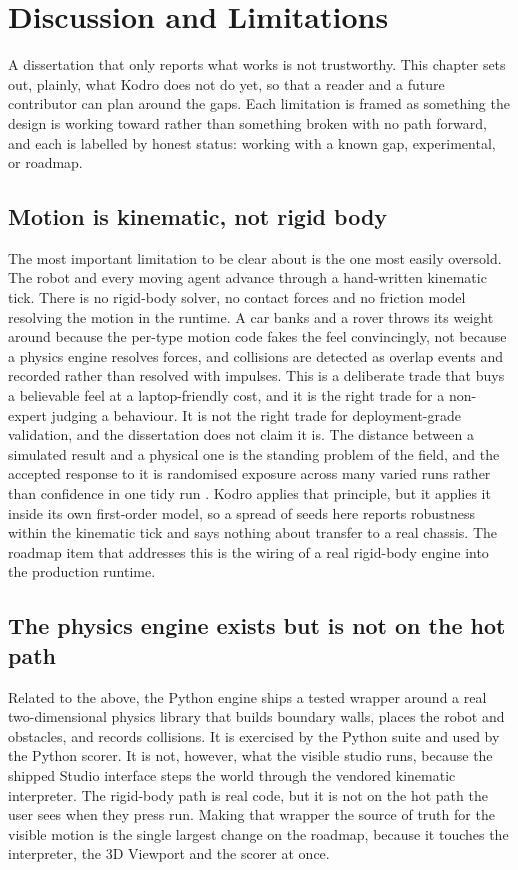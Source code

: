 \documentclass[11pt,a4paper]{report}
\begin{document}
\chapter{Discussion and Limitations}

A dissertation that only reports what works is not trustworthy. This chapter sets out, plainly, what Kodro does not do yet, so that a reader and a future contributor can plan around the gaps. Each limitation is framed as something the design is working toward rather than something broken with no path forward, and each is labelled by honest status: working with a known gap, experimental, or roadmap.

\section{Motion is kinematic, not rigid body}
The most important limitation to be clear about is the one most easily oversold. The robot and every moving agent advance through a hand-written kinematic tick. There is no rigid-body solver, no contact forces and no friction model resolving the motion in the runtime. A car banks and a rover throws its weight around because the per-type motion code fakes the feel convincingly, not because a physics engine resolves forces, and collisions are detected as overlap events and recorded rather than resolved with impulses. This is a deliberate trade that buys a believable feel at a laptop-friendly cost, and it is the right trade for a non-expert judging a behaviour. It is not the right trade for deployment-grade validation, and the dissertation does not claim it is. The distance between a simulated result and a physical one is the standing problem of the field, and the accepted response to it is randomised exposure across many varied runs rather than confidence in one tidy run \citep{tobin2017}. Kodro applies that principle, but it applies it inside its own first-order model, so a spread of seeds here reports robustness within the kinematic tick and says nothing about transfer to a real chassis. The roadmap item that addresses this is the wiring of a real rigid-body engine into the production runtime.

\section{The physics engine exists but is not on the hot path}
Related to the above, the Python engine ships a tested wrapper around a real two-dimensional physics library that builds boundary walls, places the robot and obstacles, and records collisions. It is exercised by the Python suite and used by the Python scorer. It is not, however, what the visible studio runs, because the shipped Studio interface steps the world through the vendored kinematic interpreter. The rigid-body path is real code, but it is not on the hot path the user sees when they press run. Making that wrapper the source of truth for the visible motion is the single largest change on the roadmap, because it touches the interpreter, the 3D Viewport and the scorer at once.
\end{document}
